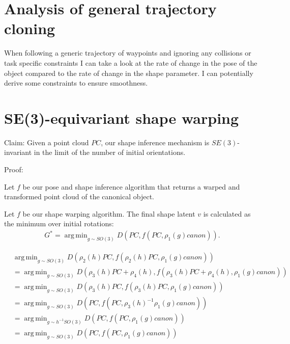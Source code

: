 \documentclass{article}
\DeclareMathOperator*{\argmin}{arg\,min}
\begin{document}
\section{Analysis of general trajectory cloning}

When following a generic trajectory of waypoints and ignoring any collisions or task specific constraints I can take a look at the rate of change in the pose of the object compared to the rate of change in the shape parameter. I can potentially derive some constraints to ensure smoothness.

\section{SE(3)-equivariant shape warping}

Claim: Given a point cloud $PC$, our shape inference mechanism is $SE(3)$-invariant in the limit of the number of initial orientations.

Proof:

Let $f$ be our pose and shape inference algorithm that returns a warped and transformed point cloud of the canonical object. 

Let $f$ be our shape warping algorithm. The final shape latent $v$ is calculated as the minimum over initial rotations:
\begin{align}
    G^* = \argmin_{g \sim SO(3)} D(PC, f(PC, \rho_1(g) canon)).
\end{align}

\begin{align}
    &\argmin_{g \sim SO(3)} D(\rho_2(h) PC, f(\rho_2(h) PC, \rho_1(g) canon)) \\
    &= \argmin_{g \sim SO(3)} D(\rho_3(h) PC + \rho_4(h), f(\rho_3(h) PC + \rho_4(h), \rho_1(g) canon)) \\
    &= \argmin_{g \sim SO(3)} D(\rho_3(h) PC, f(\rho_3(h) PC, \rho_1(g) canon)) \\
    &= \argmin_{g \sim SO(3)} D(PC, f(PC, \rho_3(h)^{-1} \rho_1(g) canon)) \\
    &= \argmin_{g \sim h^{-1} SO(3)} D(PC, f(PC, \rho_1(g) canon)) \\
    &= \argmin_{g \sim SO(3)} D(PC, f(PC, \rho_1(g) canon)) \\
\end{align}
\end{document}
